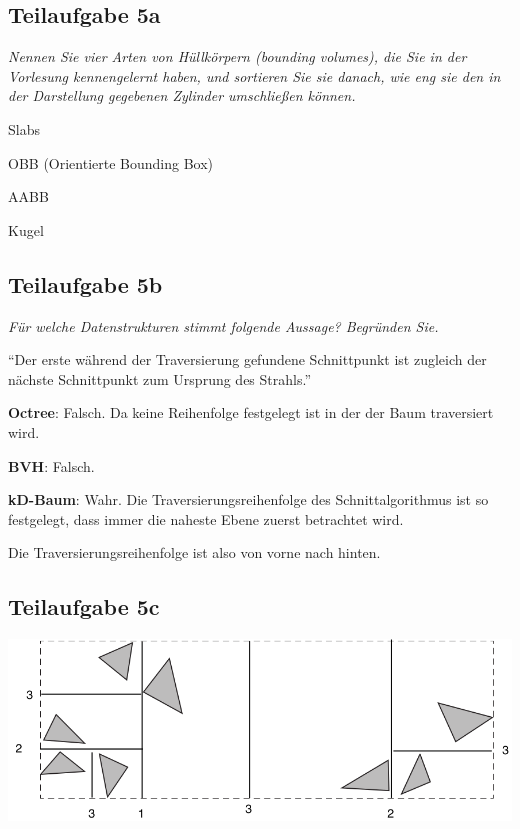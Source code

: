 \documentclass[a4paper]{scrartcl}
\begin{document}
\subsection*{Teilaufgabe 5a}
\textit{Nennen Sie vier Arten von Hüllkörpern (bounding volumes), die Sie in
der Vorlesung kennengelernt haben, und sortieren Sie sie danach, wie eng sie
den in der Darstellung gegebenen Zylinder umschließen können.}

\begin{enumerate*}[label=(\Alph*)]
    \item Slabs
    \item OBB (Orientierte Bounding Box)
    \item AABB
    \item Kugel
\end{enumerate*}


\subsection*{Teilaufgabe 5b}
\textit{Für welche Datenstrukturen stimmt folgende Aussage? Begründen Sie.}

\enquote{Der erste während der Traversierung gefundene Schnittpunkt ist
zugleich der nächste Schnittpunkt zum Ursprung des Strahls.}

\textbf{Octree}: Falsch. Da keine Reihenfolge festgelegt ist in der der Baum
                 traversiert wird.

\textbf{BVH}: Falsch.

\textbf{kD-Baum}: Wahr. Die Traversierungsreihenfolge des Schnittalgorithmus
                  ist so festgelegt, dass immer die naheste Ebene zuerst
                  betrachtet wird.

                  Die Traversierungsreihenfolge ist also von vorne nach hinten.

\subsection*{Teilaufgabe 5c}
\includegraphics*[width=\linewidth, keepaspectratio]{5c.png}
\end{document}
